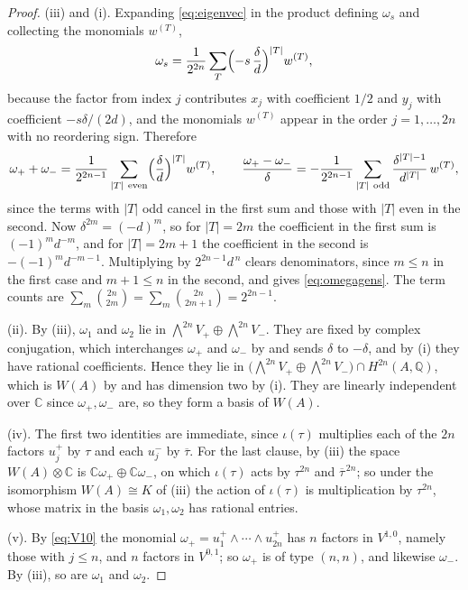 \documentclass[11pt,reqno]{amsart}
\theoremstyle{plain}
\theoremstyle{definition}
\theoremstyle{remark}
\newcommand{\QQ}{\mathbb{Q}}
\newcommand{\CC}{\mathbb{C}}
\newcommand{\HW}{W}                      %
\newcommand{\bbar}[1]{\overline{#1}}
\begin{document}
\begin{proof}
(iii) and (i). Expanding \eqref{eq:eigenvec} in the product defining
$\omega_{s}$ and collecting the monomials $w^{(T)}$,
\begin{equation}\label{eq:omegaexp}
  \omega_{s}
  =\frac{1}{2^{2n}}\sum_{T}\Bigl(-s\,\frac{\delta}{d}\Bigr)^{|T|}w^{(T)},
\end{equation}
because the factor from index $j$ contributes $x_{j}$ with coefficient $1/2$
and $y_{j}$ with coefficient $-s\delta/(2d)$, and the monomials $w^{(T)}$
appear in the order $j=1,\dots,2n$ with no reordering sign. Therefore
\[
  \omega_{+}+\omega_{-}
  =\frac{1}{2^{2n-1}}\sum_{|T|\ \mathrm{even}}\Bigl(\frac{\delta}{d}\Bigr)^{|T|}w^{(T)},
  \qquad
  \frac{\omega_{+}-\omega_{-}}{\delta}
  =-\frac{1}{2^{2n-1}}\sum_{|T|\ \mathrm{odd}}\frac{\delta^{|T|-1}}{d^{|T|}}\,w^{(T)} ,
\]
since the terms with $|T|$ odd cancel in the first sum and those with $|T|$
even in the second. Now
$\delta^{2m}=(-d)^{m}$, so for $|T|=2m$ the coefficient in the first sum is
$(-1)^{m}d^{-m}$, and for $|T|=2m+1$ the coefficient in the second is
$-(-1)^{m}d^{-m-1}$. Multiplying by $2^{2n-1}d^{\,n}$ clears denominators,
since $m\le n$ in the first case and $m+1\le n$ in the second, and gives
\eqref{eq:omegagens}. The term counts are
$\sum_{m}\binom{2n}{2m}=\sum_{m}\binom{2n}{2m+1}=2^{2n-1}$.

(ii). By (iii), $\omega_{1}$ and $\omega_{2}$ lie in
$\bigwedge^{2n}V_{+}\oplus\bigwedge^{2n}V_{-}$. They are fixed by complex
conjugation, which interchanges $\omega_{+}$ and $\omega_{-}$ by
 and sends $\delta$ to $-\delta$, and by (i) they have
rational coefficients. Hence they lie in
$\bigl(\bigwedge^{2n}V_{+}\oplus\bigwedge^{2n}V_{-}\bigr)\cap H^{2n}(A,\QQ)$,
which is $\HW(A)$ by  and has dimension two by
(i). They are linearly independent over $\CC$ since
$\omega_{+},\omega_{-}$ are, so they form a basis of $\HW(A)$.

(iv). The first two identities are immediate, since $\iota(\tau)$ multiplies
each of the $2n$ factors $u_{j}^{+}$ by $\tau$ and each $u_{j}^{-}$ by
$\bbar{\tau}$. For the last clause, by (iii) the space $\HW(A)\otimes\CC$ is
$\CC\omega_{+}\oplus\CC\omega_{-}$, on which $\iota(\tau)$ acts by
$\tau^{2n}$ and $\bbar{\tau}^{\,2n}$; so under the isomorphism
$\HW(A)\cong K$ of (iii) the action of $\iota(\tau)$ is
multiplication by $\tau^{2n}$, whose matrix in the basis
$\omega_{1},\omega_{2}$ has rational entries.

(v). By \eqref{eq:V10} the monomial $\omega_{+}=u_{1}^{+}\wedge\cdots\wedge
u_{2n}^{+}$ has $n$ factors in $V^{1,0}$, namely those with $j\le n$, and $n$
factors in $V^{0,1}$; so $\omega_{+}$ is of type $(n,n)$, and likewise
$\omega_{-}$. By (iii), so are $\omega_{1}$ and $\omega_{2}$.
\end{proof}
\end{document}
